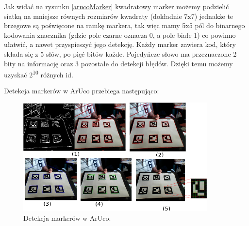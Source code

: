 Jak widać na rysunku \ref{arucoMarker} kwadratowy marker możemy podzielić siatką na mniejsze równych rozmiarów kwadraty (dokładnie 7x7) jednakże te brzegowe są poświęcone na ramkę markera, tak więc mamy 5x5 pól do binarnego kodowania znacznika (gdzie pole czarne oznacza 0, a pole białe 1) co powinno ułatwić, a nawet przyspieszyć jego detekcję. Każdy marker zawiera kod, który składa się z 5 słów, po pięć bitów każde. Pojedyńcze słowo ma przeznaczone 2 bity na informację oraz 3 pozostałe do detekcji błędów. Dzięki temu możemy uzyskać 2\textsuperscript{10} różnych id.
\bigskip

Detekcja markerów w ArUco przebiega następująco:
\begin{figure}[ht!]
\centering
\includegraphics[width=100mm]{aruco-detection.png}
\caption{Detekcja markerów w ArUco. \label{arucoDetection}}
\end{figure}

